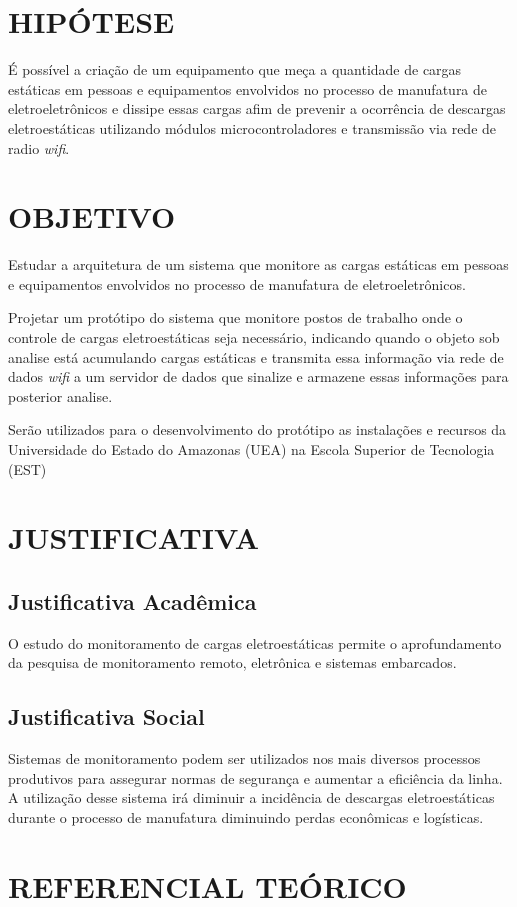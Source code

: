 \documentclass[
	12pt,				%
	openright,			%
	oneside,			%
	a4paper,			%
	chapter=TITLE,		%
	english,			%
	french,				%
	spanish,			%
	brazil,				%
	article,			%
	]{uea-abntex2}
\begin{document}
\section{HIPÓTESE}
É possível a criação de um equipamento que meça a quantidade de cargas estáticas em pessoas e equipamentos envolvidos no processo de manufatura de eletroeletrônicos e dissipe essas cargas afim de prevenir a ocorrência de descargas eletroestáticas utilizando módulos microcontroladores e transmissão via rede de radio \textit{wifi}. 
\section{OBJETIVO}
Estudar a arquitetura de um sistema que monitore as cargas estáticas em pessoas e equipamentos envolvidos no processo de manufatura de eletroeletrônicos.

Projetar um protótipo do sistema que monitore postos de trabalho onde o controle de cargas eletroestáticas seja necessário, indicando quando o objeto sob analise está acumulando cargas estáticas e transmita essa informação via rede de dados \textit{wifi} a um servidor de dados que sinalize e armazene essas informações para posterior analise.

Serão utilizados para o desenvolvimento do protótipo as instalações e recursos da Universidade do Estado do Amazonas (UEA) na Escola Superior de Tecnologia (EST)
\section{JUSTIFICATIVA}

\subsection{Justificativa Acadêmica}
O estudo do monitoramento de cargas eletroestáticas permite o aprofundamento da pesquisa de monitoramento remoto, eletrônica e sistemas embarcados.
\subsection{Justificativa Social}
Sistemas de monitoramento podem ser utilizados nos mais diversos processos produtivos para assegurar normas de segurança e aumentar a eficiência da linha.
A utilização desse sistema irá diminuir a incidência de descargas eletroestáticas durante o processo de manufatura diminuindo perdas econômicas e logísticas.
\section{REFERENCIAL TEÓRICO}
\end{document}
